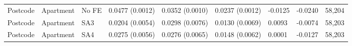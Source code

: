 \begin{table}[!htbp]
{\begin{tabular}{lllllllll}
Postcode & Apartment & No FE & 0.0477 (0.0012) & 0.0352 (0.0010) & 0.0237 (0.0012) & -0.0125 & -0.0240 & 58,204 \\
Postcode & Apartment & SA3 & 0.0204 (0.0054) & 0.0298 (0.0076) & 0.0130 (0.0069) & 0.0093 & -0.0074 & 58,203 \\
Postcode & Apartment & SA4 & 0.0275 (0.0056) & 0.0276 (0.0065) & 0.0148 (0.0062) & 0.0001 & -0.0127 & 58,203 \\
\end{tabular}
}
\par{}
\end{table}
